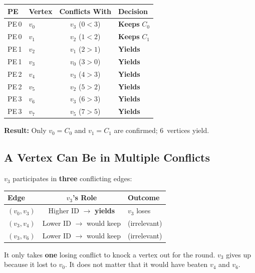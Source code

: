 \documentclass[11pt,letterpaper]{article}
\begin{document}
\begin{center}
\renewcommand{\arraystretch}{1.2}
\begin{tabular}{llcl}
\toprule
PE & Vertex & Conflicts With & Decision \\
\midrule
PE\,0 & $v_0$ & $v_3$ ($0<3$) & \textcolor{confirmGreen}{\textbf{Keeps} $C_0$} \\
PE\,0 & $v_1$ & $v_2$ ($1<2$) & \textcolor{confirmGreen}{\textbf{Keeps} $C_1$} \\
PE\,1 & $v_2$ & $v_1$ ($2>1$) & \textcolor{conflictRed}{\textbf{Yields}} \\
PE\,1 & $v_3$ & $v_0$ ($3>0$) & \textcolor{conflictRed}{\textbf{Yields}} \\
PE\,2 & $v_4$ & $v_3$ ($4>3$) & \textcolor{conflictRed}{\textbf{Yields}} \\
PE\,2 & $v_5$ & $v_2$ ($5>2$) & \textcolor{conflictRed}{\textbf{Yields}} \\
PE\,3 & $v_6$ & $v_3$ ($6>3$) & \textcolor{conflictRed}{\textbf{Yields}} \\
PE\,3 & $v_7$ & $v_5$ ($7>5$) & \textcolor{conflictRed}{\textbf{Yields}} \\
\bottomrule
\end{tabular}
\end{center}

\noindent\textbf{Result:} Only $v_0{=}C_0$ and $v_1{=}C_1$ are confirmed; 6~vertices yield.

\subsection{A Vertex Can Be in Multiple Conflicts}

$v_3$ participates in \textbf{three} conflicting edges:

\begin{center}
\begin{tabular}{lcl}
\toprule
Edge & $v_3$'s Role & Outcome \\
\midrule
$(v_0,v_3)$ & Higher ID $\rightarrow$ \textbf{yields} & $v_3$ loses \\
$(v_3,v_4)$ & Lower ID $\rightarrow$ would keep & (irrelevant) \\
$(v_3,v_6)$ & Lower ID $\rightarrow$ would keep & (irrelevant) \\
\bottomrule
\end{tabular}
\end{center}

It only takes \textbf{one} losing conflict to knock a vertex out for the round. $v_3$ gives up because it lost to $v_0$. It does not matter that it would have beaten $v_4$ and $v_6$.
\end{document}

